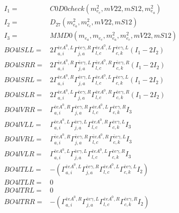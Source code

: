\documentclass[A4,landscape]{article}
\begin{document}
\begin{align} 
I_1 = & C0D0check(m^2_{e_{{c}}}, mV22, mS12, m^2_{e_{{a}}}) \\ 
I_2 = & D_{27}(m^2_{e_{{a}}}, m^2_{e_{{c}}}, mV22, mS12) \\ 
I_3 = & MMD0(m_{e_{{a}}}, m_{e_{{c}}}, m^2_{e_{{a}}}, m^2_{e_{{c}}}, mV22, mS12) \\ 
  BO4lSLL= & 2  \Gamma^{\bar{e}e A^0 ,L}_{a, i} \Gamma^{\bar{e}e \gamma ,R}_{j, a} \Gamma^{\bar{e}e A^0 ,L}_{l, c} \Gamma^{\bar{e}e \gamma ,L}_{c, k} (I_1 - 2 I_2) \\ 
  BO4lSRR= & 2  \Gamma^{\bar{e}e A^0 ,R}_{a, i} \Gamma^{\bar{e}e \gamma ,L}_{j, a} \Gamma^{\bar{e}e A^0 ,R}_{l, c} \Gamma^{\bar{e}e \gamma ,R}_{c, k} (I_1 - 2 I_2) \\ 
  BO4lSRL= & 2  \Gamma^{\bar{e}e A^0 ,R}_{a, i} \Gamma^{\bar{e}e \gamma ,L}_{j, a} \Gamma^{\bar{e}e A^0 ,L}_{l, c} \Gamma^{\bar{e}e \gamma ,L}_{c, k} (I_1 - 2 I_2) \\ 
  BO4lSLR= & 2  \Gamma^{\bar{e}e A^0 ,L}_{a, i} \Gamma^{\bar{e}e \gamma ,R}_{j, a} \Gamma^{\bar{e}e A^0 ,R}_{l, c} \Gamma^{\bar{e}e \gamma ,R}_{c, k} (I_1 - 2 I_2) \\ 
  BO4lVRR= &  \Gamma^{\bar{e}e A^0 ,R}_{a, i} \Gamma^{\bar{e}e \gamma ,R}_{j, a} \Gamma^{\bar{e}e A^0 ,L}_{l, c} \Gamma^{\bar{e}e \gamma ,R}_{c, k} I_3 \\ 
  BO4lVLL= &  \Gamma^{\bar{e}e A^0 ,L}_{a, i} \Gamma^{\bar{e}e \gamma ,L}_{j, a} \Gamma^{\bar{e}e A^0 ,R}_{l, c} \Gamma^{\bar{e}e \gamma ,L}_{c, k} I_3 \\ 
  BO4lVRL= &  \Gamma^{\bar{e}e A^0 ,R}_{a, i} \Gamma^{\bar{e}e \gamma ,R}_{j, a} \Gamma^{\bar{e}e A^0 ,R}_{l, c} \Gamma^{\bar{e}e \gamma ,L}_{c, k} I_3 \\ 
  BO4lVLR= &  \Gamma^{\bar{e}e A^0 ,L}_{a, i} \Gamma^{\bar{e}e \gamma ,L}_{j, a} \Gamma^{\bar{e}e A^0 ,L}_{l, c} \Gamma^{\bar{e}e \gamma ,R}_{c, k} I_3 \\ 
  BO4lTLL= & -( \Gamma^{\bar{e}e A^0 ,L}_{a, i} \Gamma^{\bar{e}e \gamma ,R}_{j, a} \Gamma^{\bar{e}e A^0 ,L}_{l, c} \Gamma^{\bar{e}e \gamma ,L}_{c, k} I_2) \\ 
  BO4lTLR= & 0 \\ 
  BO4lTRL= & 0 \\ 
  BO4lTRR= & -( \Gamma^{\bar{e}e A^0 ,R}_{a, i} \Gamma^{\bar{e}e \gamma ,L}_{j, a} \Gamma^{\bar{e}e A^0 ,R}_{l, c} \Gamma^{\bar{e}e \gamma ,R}_{c, k} I_2) \\ 
\end{align} 
\end{document}
